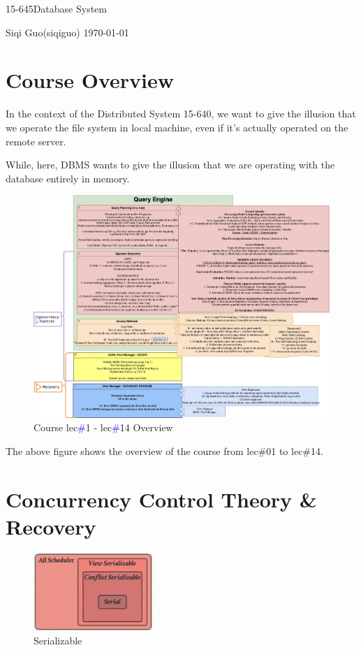 \documentclass[letterpaper,11pt]{exam}
\newcommand{\coursenum}{15-645\quad}
\newcommand{\coursename}{\coursenum Database System}
\newcommand{\fullname}{Siqi Guo}
\newcommand{\andrew}{siqiguo}
\begin{document}
\begin{center}
    {\LARGE\coursename\par}
    \fullname \quad (\andrew) \hfill \today
\end{center}

\section*{Course Overview}


In the context of the Distributed System 15-640, we want to give the illusion that we operate the file system in local machine, even if it's actually operated on the remote server.

While, here, DBMS wants to give the illusion that we are operating with the database entirely in memory.

\vspace*{1em}
\begin{figure}[h]
  \hspace{-40pt}
  \includegraphics[width=1.15\textwidth]{../assets/course-notes.jpg}
  \caption{Course lec{\footnotesize\textcolor{blue}{\#}}1 - lec{\footnotesize\textcolor{blue}{\#}}14 Overview}
\end{figure}

The above figure shows the overview of the course from lec\#01 to lec\#14.

\section*{Concurrency Control Theory \& Recovery}
\begin{figure}
  \centering
  \includegraphics[width=0.4\textwidth]{../assets/serializable.jpg}
  \caption{Serializable}
\end{figure}
\end{document}

